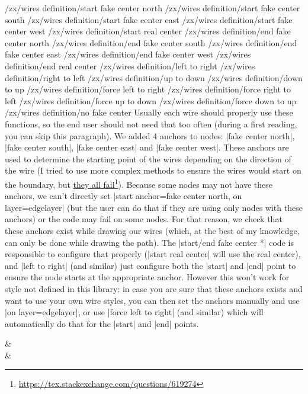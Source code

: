 \documentclass[a4paper]{ltxdoc}
\newcommand{\mylink}[2]{\href{#1}{#2}\footnote{\url{#1}}}
\begin{document}
{\begin{pgfmanualentry}
  \makeatletter
  \def\extrakeytext{style, }
  \extractkey/zx/wires definition/start fake center north\@nil%
  \extractkey/zx/wires definition/start fake center south\@nil%
  \extractkey/zx/wires definition/start fake center east\@nil%
  \extractkey/zx/wires definition/start fake center west\@nil%
  \extractkey/zx/wires definition/start real center\@nil
  \extractkey/zx/wires definition/end fake center north\@nil%
  \extractkey/zx/wires definition/end fake center south\@nil%
  \extractkey/zx/wires definition/end fake center east\@nil%
  \extractkey/zx/wires definition/end fake center west\@nil%
  \extractkey/zx/wires definition/end real center\@nil
  \extractkey/zx/wires definition/left to right\@nil%
  \extractkey/zx/wires definition/right to left\@nil%
  \extractkey/zx/wires definition/up to down\@nil%
  \extractkey/zx/wires definition/down to up\@nil%
  \extractkey/zx/wires definition/force left to right\@nil%
  \extractkey/zx/wires definition/force right to left\@nil%
  \extractkey/zx/wires definition/force up to down\@nil%
  \extractkey/zx/wires definition/force down to up\@nil%
  \extractkey/zx/wires definition/no fake center\@nil%
  \makeatother
  \pgfmanualbody
  Usually each wire should properly use these functions, so the end user should not need that too often (during a first reading, you can skip this paragraph). We added 4 anchors to nodes: |fake center north|, |fake center south|, |fake center east| and |fake center west|. These anchors are used to determine the starting point of the wires depending on the direction of the wire (I tried to use more complex methods to ensure the wires would start on the boundary, but \mylink{https://tex.stackexchange.com/questions/619274}{they all fail}). Because some nodes may not have these anchors, we can't directly set |start anchor=fake center north, on layer=edgelayer| (but the user can do that if they are using only nodes with these anchors) or the code may fail on some nodes. For that reason, we check that these anchors exist while drawing our wires (which, at the best of my knowledge, can only be done while drawing the path). The |start/end fake center *| code is responsible to configure that properly (|start real center| will use the real center), and |left to right| (and similar) just configure both the |start| and |end| point to ensure the node starts at the appropriate anchor. However this won't work for style not defined in this library: in case you are sure that these anchors exists and want to use your own wire styles, you can then set the anchors manually and use |on layer=edgelayer|, or use |force left to right| (and similar) which will automatically do that for the |start| and |end| points.
\begin{codeexample}[]
\begin{ZX}
  \zxX{\alpha+\beta}  & \zxZ{\alpha+\beta}\\
  \zxX{\alpha+\beta} \ar[r,o'] & \zxZ{\alpha+\beta}
\end{ZX}
\end{codeexample}
\end{pgfmanualentry}

}
\end{document}
